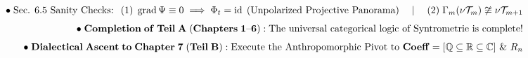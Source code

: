 \documentclass[preview]{standalone}
\begin{document}
\begin{align*}
\special{dvisvgm:raw <g id='unique000'>}\bullet\;\text{Sec. 6.5 Sanity Checks: }\; (1)\;\operatorname{grad}\Psi\equiv 0 \implies \Phi_t=\operatorname{id}\;\text{(Unpolarized Projective Panorama)} \quad\mid\quad (2)\;\Gamma_m(\nu\mathcal{T}_m)\not\cong\nu\mathcal{T}_{m+1}\\[4pt]\bullet\;\mathbf{Completion\;of\;Teil\;A\;(Chapters\;1\text{--}6):}\;\text{The universal categorical logic of Syntrometrie is complete!}\\[4pt]\bullet\;\mathbf{Dialectical\;Ascent\;to\;Chapter\;7\;(Teil\;B):}\;\text{Execute the Anthropomorphic Pivot to }\mathbf{Coeff}=[\mathbb{Q}\subseteq\mathbb{R}\subseteq\mathbb{C}]\text{ \& }R_n\special{dvisvgm:raw </g>}
\end{align*}
\end{document}

